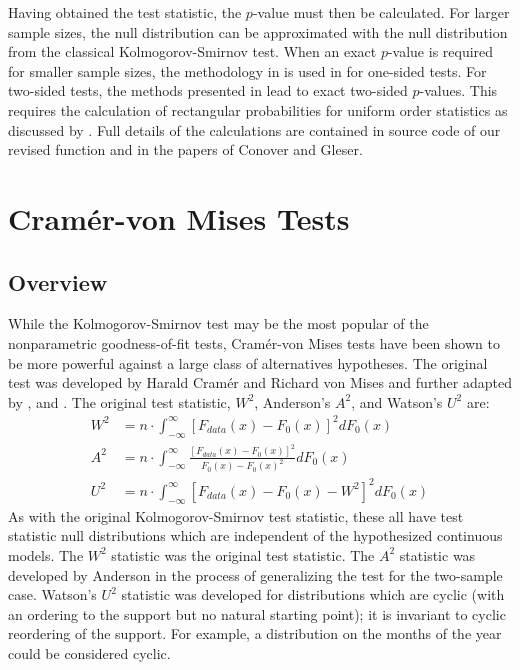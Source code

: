 Having obtained the test statistic, the $p$-value must then be calculated. 
For larger sample sizes, the null distribution can be approximated
with the null distribution from the classical Kolmogorov-Smirnov test. 
When an exact $p$-value is required for
smaller sample sizes, the methodology in \citet{Conover1972} is used in
for one-sided tests.  For two-sided tests, the methods presented in
\citet{gleser85} lead to exact two-sided $p$-values.  This requires the
calculation of rectangular probabilities for uniform order statistics
as discussed by \citet{nieder81}.
Full details of the calculations are contained in source code
of our revised function  and in the papers of
Conover and Gleser.

\section{Cram\'{e}r-von Mises Tests}

\subsection{Overview}

While the Kolmogorov-Smirnov test may be the most popular of
the nonparametric goodness-of-fit tests, Cram\'{e}r-von Mises
tests have been shown to be more powerful against a large class
of alternatives hypotheses. 
The original test was developed by
Harald Cram\'{e}r and Richard von Mises \citep{cramer1928, vonmises1928} 
and further adapted by \cite{anderson1952}, and  \cite{Watson1961}. 
The original test statistic, $W^2$, Anderson's $A^2$, and Watson's
$U^2$ are:
\begin{align}
W^2 &= n \cdot \int_{-\infty}^{\infty} \left[ F_{data}(x)- F_{0}(x) \right]^2 dF_0(x) \label{W2} \\
A^2 &= n \cdot \int_{-\infty}^{\infty} \frac{\left[F_{data}(x)- F_{0}(x) \right]^2}{F_0(x) -F_0(x)^2} dF_0(x) \label{A2} \\
U^2 &= n \cdot \int_{-\infty}^{\infty} \left[ F_{data}(x)- F_{0}(x) - W^2 \right]^2 dF_0(x) \label{U2}
\end{align}
As with the original Kolmogorov-Smirnov test statistic, these all have 
test statistic null distributions which are independent of the
hypothesized continuous models.
The $W^2$ statistic was the original test statistic.
The $A^2$ statistic was developed by
Anderson in the process of generalizing the test for the two-sample case.
Watson's $U^2$ statistic was developed for distributions
which are cyclic (with an ordering to the support but
no natural starting point); it is invariant to cyclic reordering of
the support.   For example, a distribution on the months of the year
could be considered cyclic.

